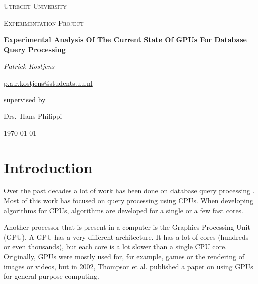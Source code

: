\documentclass[a4paper,titlepage]{article}
\begin{document}
\begin{titlepage}
	\centering
	{\scshape\LARGE Utrecht University \par}
	\vspace{1cm}
	{\scshape\Large Experimentation Project \par}
	\vspace{1.5cm}
	{\huge\bfseries Experimental Analysis Of The Current State Of GPUs For Database Query Processing\par}
	\vspace{2cm}
	
	{\Large\itshape Patrick Kostjens \par}
	\href{mailto:p.a.r.kostjens@students.uu.nl}{p.a.r.kostjens@students.uu.nl}
	\vfill
	
	supervised by\par
	Drs.~Hans Philippi
	\vfill

	{\large \today\par}
\end{titlepage}

\begin{abstract}
So far, database query processing has mostly been done using CPUs. However, recent research shows that GPUs might be able to improve the query processing performance. In this experimental analysis, we implement filter and join algorithms on both the CPU and the GPU. We compare their performance and look at some important factors that influence the performance. This gives us an idea of the current possibilities of GPUs for database query processing. We found that there are some problems with GPUs that severely limit the current applications. However, GPUs do have the potential to play an important role in speeding up database queries.

\textbf{Keywords:} query processing, graphics processing unit, relational database, parallel processing, CUDA
\end{abstract}

\section{Introduction}
Over the past decades a lot of work has been done on database query processing \cite{selinger1979,king1981,bratbergsengen1984}. Most of this work has focused on query processing using CPUs. When developing algorithms for CPUs, algorithms are developed for a single or a few fast cores.

Another processor that is present in a computer is the Graphics Processing Unit (GPU). A GPU has a very different architecture. It has a lot of cores (hundreds or even thousands), but each core is a lot slower than a single CPU core. Originally, GPUs were mostly used for, for example, games or the rendering of images or videos, but in 2002, Thompson et al. \cite{thompson2002} published a paper on using GPUs for general purpose computing.
\end{document}
